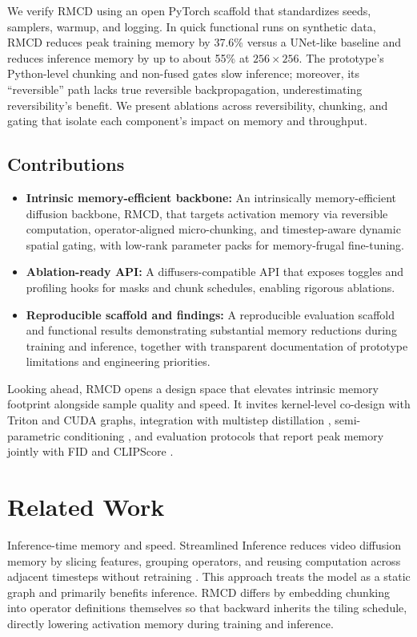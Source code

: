 \documentclass{article}
\begin{document}
We verify RMCD using an open PyTorch scaffold that standardizes seeds, samplers, warmup, and logging. In quick functional runs on synthetic data, RMCD reduces peak training memory by 37.6\% versus a UNet-like baseline and reduces inference memory by up to about 55\% at \(256\times256\). The prototype’s Python-level chunking and non-fused gates slow inference; moreover, its ``reversible'' path lacks true reversible backpropagation, underestimating reversibility’s benefit. We present ablations across reversibility, chunking, and gating that isolate each component’s impact on memory and throughput.

\subsection{Contributions}
\begin{itemize}
\item \textbf{Intrinsic memory-efficient backbone:} An intrinsically memory-efficient diffusion backbone, RMCD, that targets activation memory via reversible computation, operator-aligned micro-chunking, and timestep-aware dynamic spatial gating, with low-rank parameter packs for memory-frugal fine-tuning.
\item \textbf{Ablation-ready API:} A diffusers-compatible API that exposes toggles and profiling hooks for masks and chunk schedules, enabling rigorous ablations.
\item \textbf{Reproducible scaffold and findings:} A reproducible evaluation scaffold and functional results demonstrating substantial memory reductions during training and inference, together with transparent documentation of prototype limitations and engineering priorities.
\end{itemize}

Looking ahead, RMCD opens a design space that elevates intrinsic memory footprint alongside sample quality and speed. It invites kernel-level co-design with Triton and CUDA graphs, integration with multistep distillation \cite{salimans-2024-multistep}, semi-parametric conditioning \cite{blattmann-2022-retrieval}, and evaluation protocols that report peak memory jointly with FID and CLIPScore \cite{dhariwal-2021-diffusion,hessel-2021-clipscore}.

\section{Related Work}
Inference-time memory and speed. Streamlined Inference reduces video diffusion memory by slicing features, grouping operators, and reusing computation across adjacent timesteps without retraining \cite{zhan-2024-fast}. This approach treats the model as a static graph and primarily benefits inference. RMCD differs by embedding chunking into operator definitions themselves so that backward inherits the tiling schedule, directly lowering activation memory during training and inference.
\end{document}

